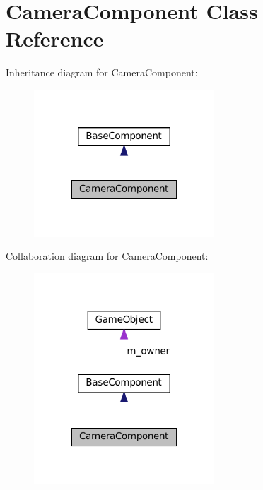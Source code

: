 \hypertarget{classCameraComponent}{}\section{Camera\+Component Class Reference}
\label{classCameraComponent}


Inheritance diagram for Camera\+Component\+:\nopagebreak
\begin{figure}[H]
\begin{center}
\leavevmode
\includegraphics[width=191pt]{classCameraComponent__inherit__graph}
\end{center}
\end{figure}


Collaboration diagram for Camera\+Component\+:\nopagebreak
\begin{figure}[H]
\begin{center}
\leavevmode
\includegraphics[width=191pt]{classCameraComponent__coll__graph}
\end{center}
\end{figure}
